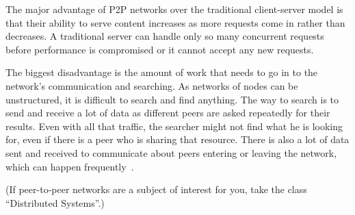The major advantage of P2P networks over the traditional client-server model is that their ability to serve content increases as more requests come in rather than decreases. A traditional server can handle only so many concurrent requests before performance is compromised or it cannot accept any new requests. 

The biggest disadvantage is the amount of work that needs to go in to the network's communication and searching. As networks of nodes can be unstructured, it is difficult to search and find anything. The way to search is to send and receive a lot of data as different peers are asked repeatedly for their results. Even with all that traffic, the searcher might not find what he is looking for, even if there is a peer who is sharing that resource. There is also a lot of data sent and received to communicate about peers entering or leaving the network, which can happen frequently~\cite{p2p2}.

(If peer-to-peer networks are a subject of interest for you, take the class ``Distributed Systems''.)



